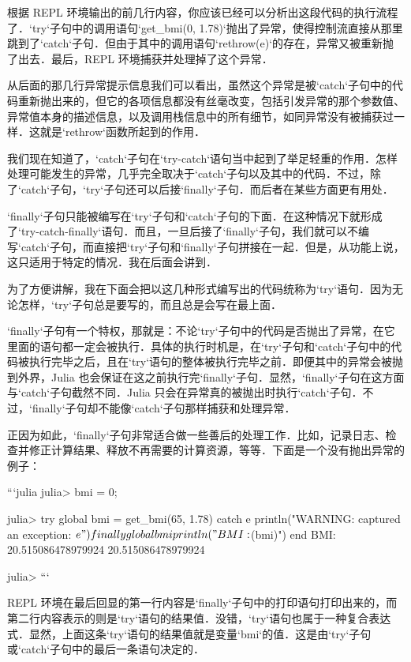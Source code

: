 根据 REPL 环境输出的前几行内容，你应该已经可以分析出这段代码的执行流程了．`try`子句中的调用语句`get_bmi(0, 1.78)`抛出了异常，使得控制流直接从那里跳到了`catch`子句．但由于其中的调用语句`rethrow(e)`的存在，异常又被重新抛了出去．最后，REPL 环境捕获并处理掉了这个异常．

从后面的那几行异常提示信息我们可以看出，虽然这个异常是被`catch`子句中的代码重新抛出来的，但它的各项信息都没有丝毫改变，包括引发异常的那个参数值、异常值本身的描述信息，以及调用栈信息中的所有细节，如同异常没有被捕获过一样．这就是`rethrow`函数所起到的作用．

我们现在知道了，`catch`子句在`try-catch`语句当中起到了举足轻重的作用．怎样处理可能发生的异常，几乎完全取决于`catch`子句以及其中的代码．不过，除了`catch`子句，`try`子句还可以后接`finally`子句．而后者在某些方面更有用处．

`finally`子句只能被编写在`try`子句和`catch`子句的下面．在这种情况下就形成了`try-catch-finally`语句．而且，一旦后接了`finally`子句，我们就可以不编写`catch`子句，而直接把`try`子句和`finally`子句拼接在一起．但是，从功能上说，这只适用于特定的情况．我在后面会讲到．

为了方便讲解，我在下面会把以这几种形式编写出的代码统称为`try`语句．因为无论怎样，`try`子句总是要写的，而且总是会写在最上面．

`finally`子句有一个特权，那就是：不论`try`子句中的代码是否抛出了异常，在它里面的语句都一定会被执行．具体的执行时机是，在`try`子句和`catch`子句中的代码被执行完毕之后，且在`try`语句的整体被执行完毕之前．即便其中的异常会被抛到外界，Julia 也会保证在这之前执行完`finally`子句．显然，`finally`子句在这方面与`catch`子句截然不同．Julia 只会在异常真的被抛出时执行`catch`子句．不过，`finally`子句却不能像`catch`子句那样捕获和处理异常．

正因为如此，`finally`子句非常适合做一些善后的处理工作．比如，记录日志、检查并修正计算结果、释放不再需要的计算资源，等等．下面是一个没有抛出异常的例子：

```julia
julia> bmi = 0;

julia> try 
           global bmi = get_bmi(65, 1.78)
       catch e
           println("WARNING: captured an exception: $e")
       finally
           global bmi
           println("BMI: $(bmi)")
       end
BMI: 20.515086478979924
20.515086478979924

julia> 
```

REPL 环境在最后回显的第一行内容是`finally`子句中的打印语句打印出来的，而第二行内容表示的则是`try`语句的结果值．没错，`try`语句也属于一种复合表达式．显然，上面这条`try`语句的结果值就是变量`bmi`的值．这是由`try`子句或`catch`子句中的最后一条语句决定的．

